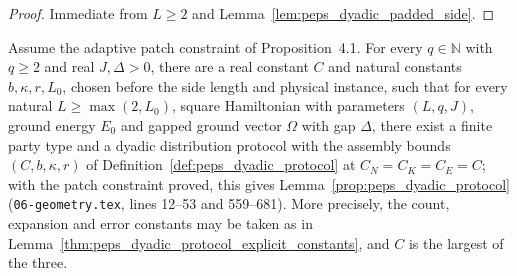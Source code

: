 \begin{proof}\leanok
    Immediate from $L\ge2$ and Lemma~\ref{lem:peps_dyadic_padded_side}.
\end{proof}

\begin{theorem}
    \label{thm:peps_protocol_from_angular_and_patch_bounds}
    \leanok
    Assume the adaptive patch constraint of Proposition~4.1. For every
    $q\in\mathbb N$ with $q\ge2$ and real $J,\Delta>0$, there are a real
    constant $C$ and natural constants $b,\kappa,r,L_0$, chosen before the
    side length and physical instance, such that for every natural
    $L\ge\max(2,L_0)$, square Hamiltonian with parameters $(L,q,J)$, ground
    energy $E_0$ and gapped ground vector $\Omega$ with gap $\Delta$, there
    exist a finite party type and a dyadic distribution protocol with the
    assembly bounds $(C,b,\kappa,r)$ of
    Definition~\ref{def:peps_dyadic_protocol} at $C_N=C_K=C_E=C$; with the patch
    constraint proved, this gives Lemma~\ref{prop:peps_dyadic_protocol}
    (\texttt{06-geometry.tex}, lines 12--53 and 559--681). More precisely, the
    count, expansion and error constants may be taken as in
    Lemma~\ref{thm:peps_dyadic_protocol_explicit_constants}, and $C$ is the
    largest of the three.
\end{theorem}

